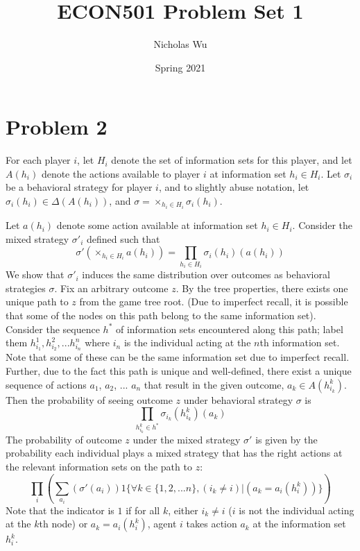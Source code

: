 \documentclass[10pt,letter]{article}
\begin{document}


\title{ECON501 Problem Set 1}

\author{Nicholas Wu}

\date{Spring 2021}

\maketitle

\section*{Problem 2}
For each player $i$, let $H_i$ denote the set of information sets for this player, and let $A(h_i)$ denote the actions available to player $i$ at information set $h_i \in H_i$. Let $\sigma_i$ be a behavioral strategy for player $i$, and to slightly abuse notation, let $\sigma_i(h_i) \in \Delta(A(h_i))$, and $\sigma = \times_{h_i \in H_i} \sigma_i(h_i)$.

Let $a(h_i)$ denote some action available at information set $h_i \in H_i$. Consider the mixed strategy $\sigma'_i$ defined such that \[ \sigma'(\times_{h_i \in H_i} a(h_i)) = \prod_{h_i \in H_i} \sigma_i(h_i)(a(h_i)) \]
We show that $\sigma'_i$ induces the same distribution over outcomes as behavioral strategies $\sigma$. Fix an arbitrary outcome $z$. By the tree properties, there exists one unique path to $z$ from the game tree root. (Due to imperfect recall, it is possible that some of the nodes on this path belong to the same information set). Consider the sequence $h^*$ of information sets encountered along this path; label them $h^1_{i_1}, h^2_{i_2},  ...  h^n_{i_n}$ where $i_n$ is the individual acting at the $n$th information set. Note that some of these can be the same information set due to imperfect recall. Further, due to the fact this path is unique and well-defined, there exist a unique sequence of actions $a_1$, $a_2$, ...  $a_n$ that result in the given outcome, $a_k \in A(h^k_{i_k})$. Then the probability of seeing outcome $z$ under behavioral strategy $\sigma$ is
\[ \prod_{h^k_{i_k} \in h^*} \sigma_{i_k}(h^k_{i_k})(a_k) \]
The probability of outcome $z$ under the mixed strategy $\sigma'$ is given by the probability each individual plays a mixed strategy that has the right actions at the relevant information sets on the path to $z$:
\[ \prod_i \left( \sum_{a_i} \left( \sigma'(a_i) \right) 1\{\forall k \in \{1, 2, ...n \}, (i_k  \neq i) | (a_k = a_i(h^k_{i}))  \} \right) \]
Note that the indicator is $1$ if for all $k$, either $i_k \neq i$ ($i$ is not the individual acting at the $k$th node) or $a_k = a_i(h^k_{i})$, agent $i$ takes action $a_k$ at the information set $h^k_{i}$.
\end{document}
